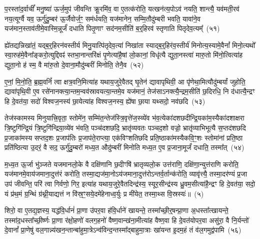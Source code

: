 प॒रस्ता॑द॒र्वाचीं᳚ मनु॒ष्या॑ ऊर्ज॒मुप॑ जीवन्ति क्रू॒रमि॑व॒ वा ए॒तत्क॑रोति॒ यत्खन॑त्य॒पो\-ऽव॑ नयति॒ शान्त्यै॒ यव॑मती॒रव॑ नय॒त्यूर्ग्वै यव॒ ऊर्गु॑दु॒म्बर॑ ऊ॒र्जैवोर्ज॒ꣳ॒ सम॑र्धयति॒ यज॑मानेन॒ सम्मि॒तौदु॑म्बरी भवति॒ यावा॑ने॒व यज॑मान॒स्ताव॑तीमे॒वास्मि॒न्नूर्जं॑ दधाति पितृ॒णाꣳ सद॑नम॒सीति॑ ब॒र्॒\mbox{}हिरव॑ स्तृणाति पितृदेव॒त्यम्᳚~(५१)

ह्ये॑तद्यन्निखा॑तं॒ यद्ब॒र्॒\mbox{}हिरन॑वस्तीर्य मिनु॒यात्पि॑तृदेव॒त्या॑ निखा॑ता स्याद्ब॒र्॒\mbox{}हिर॑व॒स्तीर्य॑ मिनोत्य॒स्यामे॒वैनां᳚ मिनो॒त्यथो᳚ स्वा॒रुह॑मे॒वैना᳚ङ्करो॒त्युद्दिवꣴ॑ स्तभा॒नान्तरि॑क्षं पृ॒णेत्या॑है॒षां लो॒कानां॒ विधृ॑त्यै द्युता॒नस्त्वा॑ मारु॒तो मि॑नो॒त्वित्या॑ह द्युता॒नो ह॑ स्म॒ वै मा॑रु॒तो दे॒वाना॒मौदु॑म्बरीं मिनोति॒ तेनै॒व~(५२)

ए॒नां॒ मि॒नो॒ति॒ ब्र॒ह्म॒वनिं᳚ त्वा क्षत्र॒वनि॒मित्या॑ह यथाय॒जुरे॒वैतद् घृ॒तेन॑ द्यावा\-पृथिवी॒ आ पृ॑णेथा॒मित्यौदु॑म्बर्यां जुहोति॒ द्यावा॑पृथि॒वी ए॒व रसे॑नानक्त्या॒न्तम॒न्वव॑स्रावयत्या॒न्तमे॒व यज॑मानं॒ तेज॑सा\-ऽनक्त्यै॒न्द्रम॒सीति॑ छ॒दिरधि॒ नि द॑धात्यै॒न्द्रꣳ हि दे॒वत॑या॒ सदो॑ विश्वज॒नस्य॑ छा॒येत्या॑ह विश्वज॒नस्य॒ ह्ये॑षा छा॒या यथ्सदो॒ नव॑छदि~(५३)

तेज॑स्कामस्य मिनुयात्त्रि॒वृता॒ स्तोमे॑न॒ सम्मि॑त॒न्तेज॑स्त्रि॒वृत्ते॑ज॒स्व्ये॑व भ॑व॒त्येका॑\-दशछदीन्द्रि॒यका॑म॒स्यैका॑\-दशाक्षरा त्रि॒ष्टुगि॑न्द्रि॒यं त्रि॒ष्टुगि॑न्द्रिया॒व्ये॑व भ॑वति॒ पञ्च॑दशछदि॒ भ्रातृ॑व्यवतः पञ्चद॒शो वज्रो॒ भ्रातृ॑व्याभिभूत्यै स॒प्तद॑शछदि प्र॒जाका॑मस्य सप्तद॒शः प्र॒जा\-प॑तिः प्र॒जा\-प॑ते॒राप्त्या॒ एक॑विꣳशतिछदि प्रति॒ष्ठाका॑मस्यैकवि॒ꣳ॒शः स्तोमा॑नां प्रति॒ष्ठा प्रति॑ष्ठित्या उ॒दरं॒ वै सद॒ ऊर्गु॑दु॒म्बरो॑ मध्य॒त औदु॑म्बरीं मिनोति मध्य॒त ए॒व प्र॒जाना॒मूर्जं॑ दधाति॒ तस्मा᳚त्~(५४)

म॒ध्य॒त ऊ॒र्जा भु॑ञ्जते यजमानलो॒के वै दक्षि॑णानि छ॒दीꣳषि॑ भ्रातृव्यलो॒क उत्त॑राणि॒ दक्षि॑णा॒न्युत्त॑राणि करोति॒ यज॑मानमे॒वाय॑जमाना॒दुत्त॑रं करोति॒ तस्मा॒द्यज॑मा॒नो\-ऽय॑जमाना॒दुत्त॑रो\-ऽन्तर्व॒र्तान्क॑रोति॒ व्यावृ॑त्त्यै॒ तस्मा॒दर॑ण्यं प्र॒जा उप॑ जीवन्ति॒ परि॑ त्वा गिर्वणो॒ गिर॒ इत्या॑ह यथाय॒जुरे॒वैतदिन्द्र॑स्य॒ स्यूर॒सीन्द्र॑स्य ध्रु॒वम॒सीत्या॑है॒न्द्रꣳ हि दे॒वत॑या॒ सदो॒ यं प्र॑थ॒मं ग्र॒न्थिं ग्र॑थ्नी॒याद्यत्तं न वि॑स्र॒ꣳ॒सये॒दमे॑हेनाध्व॒र्युः प्र मी॑येत॒ तस्मा॒थ्स वि॒स्रस्यः॑॥~(५)

{\anuvakamend[{अप॑हत्यै॒ तस्मा᳚त्पितृदेव॒त्य॑न्तेनै॒व नव॑छदि॒ तस्मा॒थ्सदः॒ पञ्च॑दश च}]}%

शिरो॒ वा ए॒तद्य॒ज्ञस्य॒ यद्ध॑वि॒र्धानं॑ प्रा॒णा उ॑पर॒वा ह॑वि॒र्धाने॑ खायन्ते॒ तस्मा᳚च्छी॒र्॒\mbox{}षन्प्रा॒णा अ॒धस्ता᳚त्खायन्ते॒ तस्मा॑द॒धस्ता᳚च्छी॒र्ष्णः प्रा॒णा र॑क्षो॒हणो॑ वलग॒हनो॑ वैष्ण॒वान्ख॑ना॒मीत्या॑ह वैष्ण॒वा हि दे॒वत॑योपर॒वा असु॑रा॒ वै नि॒र्यन्तो॑ दे॒वानां᳚ प्रा॒णेषु॑ वल॒गान्न्य॑खन॒न्तान्बा॑हुमा॒त्रे\-ऽन्व॑विन्द॒न्तस्मा᳚द्बाहुमा॒त्राः खा॑यन्त इ॒दम॒हं तं व॑ल॒गमुद्व॑पामि~(५६)

